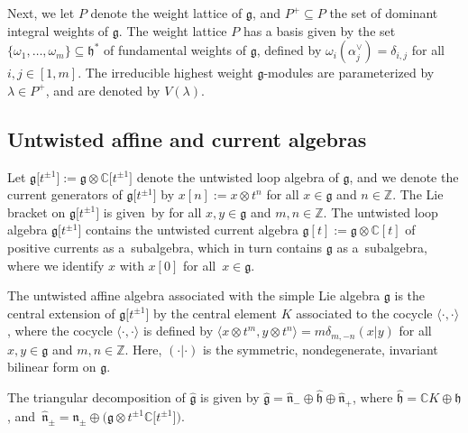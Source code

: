 \documentclass[pdftex]{sigma}
\numberwithin{equation}{section}
\begin{document}
Next, we let $P$ denote the weight lattice of $\mathfrak{g}$, and $P^+\subseteq P$ the set of dominant integral weights of $\mathfrak{g}$. The weight lattice $P$ has a basis given by the set $\{\omega_1,\dots,\omega_m\}\subseteq\mathfrak{h}^*$ of fundamental weights of $\mathfrak{g}$, defined by $\omega_i(\alpha_j^{\vee})=\delta_{i,j}$ for all $i,j\in[1,m]$. The irreducible highest weight $\mathfrak{g}$-modules are parameterized by $\lambda\in P^+$, and are denoted by $V({\lambda})$.

\subsection{Untwisted affine and current algebras}\label{Section 2.1}

Let $\mathfrak{g}\bigl[t^{\pm1}\bigr]:=\mathfrak{g}\otimes\mathbb{C}\bigl[t^{\pm1}\bigr]$ denote the untwisted loop algebra of $\mathfrak{g}$, and we denote the current generators of $\mathfrak{g}\bigl[t^{\pm1}\bigr]$ by $x[n]:=x\otimes t^n$ for all $x\in\mathfrak{g}$ and $n\in\mathbb{Z}$. The Lie bracket on $\mathfrak{g}\bigl[t^{\pm1}\bigr]$ is given~by
for all $x,y\in\mathfrak{g}$ and $m,n\in\mathbb{Z}$. The untwisted loop algebra $\mathfrak{g}\bigl[t^{\pm1}\bigr]$ contains the untwisted current algebra $\mathfrak{g}[t]:=\mathfrak{g}\otimes\mathbb{C}[t]$ of positive currents as a~subalgebra, which in turn contains $\mathfrak{g}$ as a~subalgebra, where we identify $x$ with $x[0]$ for all~${x\in\mathfrak{g}}$.

The untwisted affine algebra  associated with the simple Lie algebra $\mathfrak{g}$ is the central extension of $\mathfrak{g}\bigl[t^{\pm1}\bigr]$ by the central element $K$ associated to the cocycle $\langle\cdot,\cdot\rangle$, where the cocycle $\langle\cdot,\cdot\rangle$ is defined by
$
\big\langle x\otimes t^m,y\otimes t^n\big\rangle = m\delta_{m,-n}(x|y)$
for all $x,y\in\mathfrak{g}$ and $m,n\in\mathbb{Z}$. Here, $(\cdot|\cdot)$ is the symmetric, nondegenerate, invariant bilinear form on $\mathfrak{g}$.

The triangular decomposition of $\widehat{\mathfrak{g}}$ is given by $\widehat{\mathfrak{g}}=\widehat{\mathfrak{n}}_-\oplus\widehat{\mathfrak{h}}\oplus\widehat{\mathfrak{n}}_+$, where $\widehat{\mathfrak{h}}=\mathbb{C}K\oplus\mathfrak{h}$, and~${\widehat{\mathfrak{n}}_{\pm}=\mathfrak{n}_{\pm}\oplus \bigl(\mathfrak{g}\otimes t^{\pm1}\mathbb{C}\bigl[t^{\pm1}\bigr]\bigr)}$.
\end{document}
